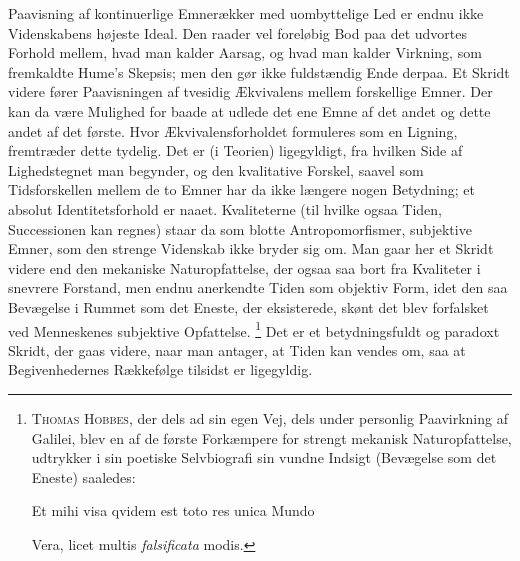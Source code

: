 \documentclass[12pt]{article}
\newcommand{\opage}[1]{\marginnote{\footnotesize\textit{[#1]}}}
\begin{document}
Paavisning af kontinuerlige Emnerækker med uombyttelige Led er endnu
ikke Videnskabens højeste Ideal. Den raader vel foreløbig Bod paa det
udvortes Forhold mellem, hvad man kalder Aarsag, og hvad man kalder
Virkning, som fremkaldte Hume's Skepsis; men den gør ikke fuldstændig
Ende derpaa. Et Skridt videre fører Paavisningen af tvesidig Ækvivalens
mellem forskellige Emner. Der kan da være Mulighed for baade at udlede
det ene Emne af det andet og dette andet af det første. Hvor
Ækvivalensforholdet formuleres som en Ligning, fremtræder dette tydelig.
Det er (i Teorien) ligegyldigt, fra hvilken Side af Lighedstegnet man
begynder, og den kvalitative Forskel, saavel som Tidsforskellen mellem
de to Emner har da ikke længere nogen Betydning; et absolut
Identitetsforhold er naaet. Kvaliteterne (til hvilke ogsaa Tiden,
Successionen kan regnes) staar da som blotte \guillemotright
Antropomorfismer\guillemotleft , subjektive Emner, som den strenge
Videnskab ikke bryder sig om. Man gaar her et Skridt videre end den
mekaniske Naturopfattelse, der ogsaa saa bort fra Kvaliteter i snevrere
Forstand, men endnu anerkendte Tiden som objektiv Form, idet den saa
Bevægelse i Rummet som
\opage{51} \setcounter{footnote}{0}
det Eneste, der eksisterede, skønt det blev \guillemotright
forfalsket\guillemotleft{} ved Menneskenes subjektive Opfattelse.%
\footnote{\textsc{Thomas Hobbes}, der dels ad sin egen Vej, dels under
personlig Paavirkning af Galilei, blev en af de første Forkæmpere for
strengt mekanisk Naturopfattelse, udtrykker i sin poetiske Selvbiografi
sin vundne Indsigt (Bevægelse som det Eneste) saaledes:\par
\centerline{Et mihi visa qvidem est toto res unica Mundo}
\centerline{Vera, licet multis \emph{falsificata} modis.}}
Det er et betydningsfuldt og paradoxt Skridt, der gaas videre, naar man
antager, at Tiden kan vendes om, saa at Begivenhedernes Rækkefølge
tilsidst er ligegyldig.
\end{document}
